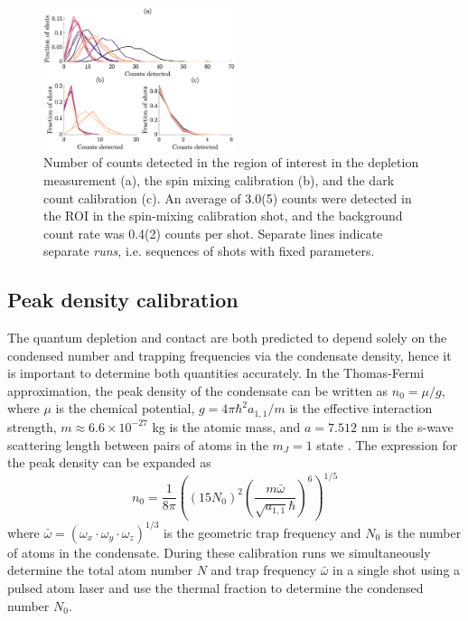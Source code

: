
\begin{figure}
	\centering
	\includegraphics[width=0.5\textwidth]{fig/QD/counts_per_run}
	\caption{Number of counts detected in the region of interest in the depletion measurement (a), the spin mixing calibration (b), and the dark count calibration (c). An average of 3.0(5) counts were detected in the ROI in the spin-mixing calibration shot, and the background count rate was 0.4(2) counts per shot. Separate lines indicate separate \emph{runs}, i.e. sequences of shots with fixed parameters.}
	\label{fig:num_counts}
\end{figure}


\subsection{Peak density calibration}

    The quantum depletion and contact are both predicted to depend solely on the condensed number and trapping frequencies via the condensate density, hence it is important to determine both quantities accurately. In the Thomas-Fermi approximation, the peak density of the condensate can be written as $n_0 = \mu/g$, where $\mu$ is the chemical potential, $g=4\pi\hbar^2a_{1,1}/m$ is the effective interaction strength, $m\approx6.6\times10^{-27}$ kg is the atomic mass, and $a=7.512$ nm is the s-wave scattering length between pairs of atoms in the $m_J=1$ state \cite{Moal06}. The expression for the peak density can be expanded as
	\begin{equation}
		n_0 = \frac{1}{8 \pi}\left( (15N_0)^2 \left(\frac{m \bar{\omega}}{\sqrt{a_{1,1}} \hbar}\right)	 ^{6}\right)^{1/5}
		\label{eqn:n0}
	\end{equation}
	where $\bar{\omega} = \left(\omega_x\cdot\omega_y\cdot\omega_z\right)^{1/3}$ is the geometric trap frequency and $N_0$ is the number of atoms in the condensate. During these calibration runs we simultaneously determine the total atom number $N$ and trap frequency $\bar{\omega}$ in a single shot using a pulsed atom laser and use the thermal fraction to determine the condensed number $N_0$. 

